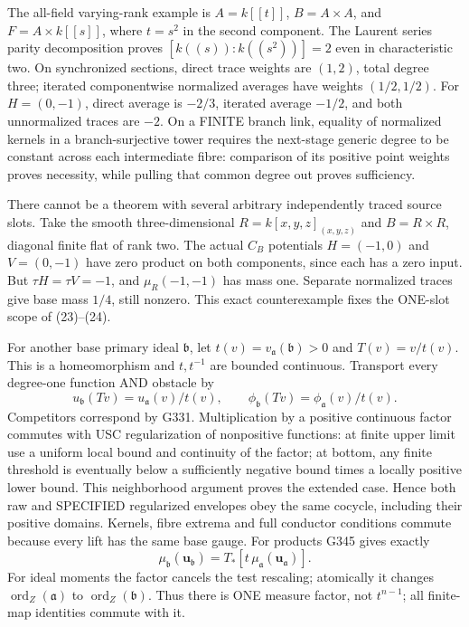 The all-field varying-rank example is $A=k[[t]]$, $B=A\times A$, and $F=A\times k[[s]]$, where $t=s^2$ in the second component. The Laurent series parity decomposition proves $[k((s)):k((s^2))]=2$ even in characteristic two. On synchronized sections, direct trace weights are $(1,2)$, total degree three; iterated componentwise normalized averages have weights $(1/2,1/2)$. For $H=(0,-1)$, direct average is $-2/3$, iterated average $-1/2$, and both unnormalized traces are $-2$. On a FINITE branch link, equality of normalized kernels in a branch-surjective tower requires the next-stage generic degree to be constant across each intermediate fibre: comparison of its positive point weights proves necessity, while pulling that common degree out proves sufficiency.

There cannot be a theorem with several arbitrary independently traced source slots. Take the smooth three-dimensional $R=k[x,y,z]_{(x,y,z)}$ and $B=R\times R$, diagonal finite flat of rank two. The actual $C_B$ potentials $H=(-1,0)$ and $V=(0,-1)$ have zero product on both components, since each has a zero input. But $\tau H=\tau V=-1$, and $\mu_R(-1,-1)$ has mass one. Separate normalized traces give base mass $1/4$, still nonzero. This exact counterexample fixes the ONE-slot scope of (23)--(24).

For another base primary ideal $\mathfrak b$, let $t(v)=v_{\mathfrak a}(\mathfrak b)>0$ and $T(v)=v/t(v)$. This is a homeomorphism and $t,t^{-1}$ are bounded continuous. Transport every degree-one function AND obstacle by
\[
u_{\mathfrak b}(Tv)=u_{\mathfrak a}(v)/t(v),\qquad
\phi_{\mathfrak b}(Tv)=\phi_{\mathfrak a}(v)/t(v).
\]
Competitors correspond by G331. Multiplication by a positive continuous factor commutes with USC regularization of nonpositive functions: at finite upper limit use a uniform local bound and continuity of the factor; at bottom, any finite threshold is eventually below a sufficiently negative bound times a locally positive lower bound. This neighborhood argument proves the extended case. Hence both raw and SPECIFIED regularized envelopes obey the same cocycle, including their positive domains. Kernels, fibre extrema and full conductor conditions commute because every lift has the same base gauge. For products G345 gives exactly
\[
\mu_{\mathfrak b}(\boldsymbol u_{\mathfrak b})
=T_*[t\,\mu_{\mathfrak a}(\boldsymbol u_{\mathfrak a})]. \tag{25}
\]
For ideal moments the factor cancels the test rescaling; atomically it changes $\operatorname{ord}_Z(\mathfrak a)$ to $\operatorname{ord}_Z(\mathfrak b)$. Thus there is ONE measure factor, not $t^{n-1}$; all finite-map identities commute with it.

